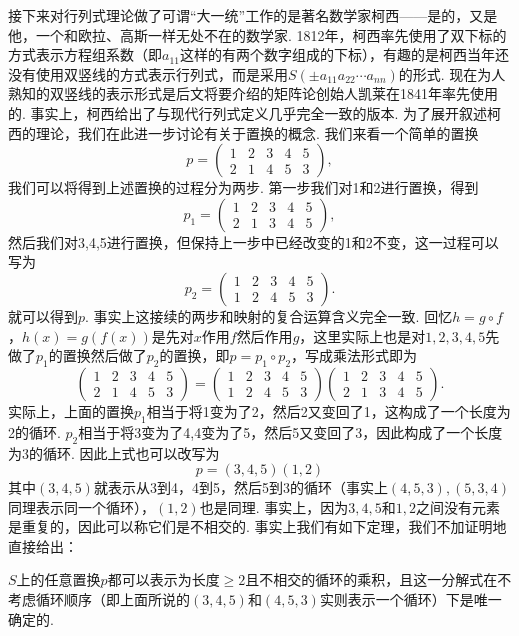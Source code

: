 接下来对行列式理论做了可谓``大一统''工作的是著名数学家柯西——是的，又是他，一个和欧拉、高斯一样无处不在的数学家. 1812年，柯西率先使用了双下标的方式表示方程组系数（即$a_{11}$这样的有两个数字组成的下标），有趣的是柯西当年还没有使用双竖线的方式表示行列式，而是采用$S(\pm a_{11}a_{22}\cdots a_{nn})$的形式. 现在为人熟知的双竖线的表示形式是后文将要介绍的矩阵论创始人凯莱在1841年率先使用的. 事实上，柯西给出了与现代行列式定义几乎完全一致的版本. 为了展开叙述柯西的理论，我们在此进一步讨论有关于置换的概念. 我们来看一个简单的置换
\[p=\begin{pmatrix}
        1 & 2 & 3 & 4 & 5 \\
        2 & 1 & 4 & 5 & 3
    \end{pmatrix},\]
我们可以将得到上述置换的过程分为两步. 第一步我们对1和2进行置换，得到
\[p_1=\begin{pmatrix}
        1 & 2 & 3 & 4 & 5 \\
        2 & 1 & 3 & 4 & 5
    \end{pmatrix},\]
然后我们对3,4,5进行置换，但保持上一步中已经改变的1和2不变，这一过程可以写为
\[p_2=\begin{pmatrix}
        1 & 2 & 3 & 4 & 5 \\
        1 & 2 & 4 & 5 & 3
    \end{pmatrix}.\]
就可以得到$p$. 事实上这接续的两步和映射的复合运算含义完全一致. 回忆$h=g\circ f$，$h(x)=g(f(x))$是先对$x$作用$f$然后作用$g$，这里实际上也是对$1,2,3,4,5$先做了$p_1$的置换然后做了$p_2$的置换，即$p=p_1\circ p_2$，写成乘法形式即为
\[\begin{pmatrix}
        1 & 2 & 3 & 4 & 5 \\
        2 & 1 & 4 & 5 & 3
    \end{pmatrix}=\begin{pmatrix}
        1 & 2 & 3 & 4 & 5 \\
        1 & 2 & 4 & 5 & 3
    \end{pmatrix}\begin{pmatrix}
        1 & 2 & 3 & 4 & 5 \\
        2 & 1 & 3 & 4 & 5
    \end{pmatrix}.\]
实际上，上面的置换$p_1$相当于将1变为了2，然后2又变回了1，这构成了一个长度为2的循环. $p_2$相当于将3变为了4,4变为了5，然后5又变回了3，因此构成了一个长度为3的循环. 因此上式也可以改写为
\[p=(3,4,5)(1,2)\]
其中$(3,4,5)$就表示从3到4，4到5，然后5到3的循环（事实上$(4,5,3),(5,3,4)$同理表示同一个循环），$(1,2)$也是同理. 事实上，因为$3,4,5$和$1,2$之间没有元素是重复的，因此可以称它们是不相交的. 事实上我们有如下定理，我们不加证明地直接给出：
\begin{theorem}
    $S$上的任意置换$p$都可以表示为长度$\geqslant 2$且不相交的循环的乘积，且这一分解式在不考虑循环顺序（即上面所说的$(3,4,5)$和$(4,5,3)$实则表示一个循环）下是唯一确定的.
\end{theorem}

